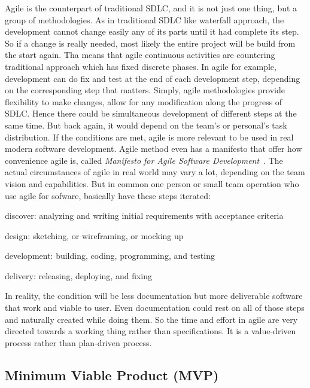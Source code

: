 Agile is the counterpart of traditional \ac{SDLC}, and it is not just one thing, but a group of methodologies.
As in traditional \ac{SDLC} like waterfall approach, the development cannot change easily any of its parts until it had complete its step.
So if a change is really needed, most likely the entire project will be build from the start again.
Tha means that agile continuous activities are countering traditional approach which has fixed discrete phases.
In agile for example, development can do fix and test at the end of each development step, depending on the corresponding step that matters.
Simply, agile methodologies provide flexibility to make changes, allow for any modification along the progress of \ac{SDLC}.
Hence there could be simultaneous development of different steps at the same time.
But back again, it would depend on the team's or personal's task distribution.
If the conditions are met, agile is more relevant to be used in real modern software development.
Agile method even has a manifesto that offer how convenience agile is, called \textit{Manifesto for Agile Software Development}~\autocite{Beck2001Manifesto}.
The actual circumstances of agile in real world may vary a lot, depending on the team vision and capabilities.
But in common one person or small team operation who use agile for sofware, basically have these steps iterated:
\begin{inparaenum}
\item discover: analyzing and writing initial requirements with acceptance criteria
\item design: sketching, or wireframing, or mocking up
\item development: building, coding, programming, and testing
\item delivery: releasing, deploying, and fixing
\end{inparaenum}
In reality, the condition will be less documentation but more deliverable software that work and viable to user.
Even documentation could rest on all of those steps and naturally created while doing them.
So the time and effort in agile are very directed towards a working thing rather than specifications.
It is a value-driven process rather than plan-driven process.

\subsection{Minimum Viable Product (MVP)}

